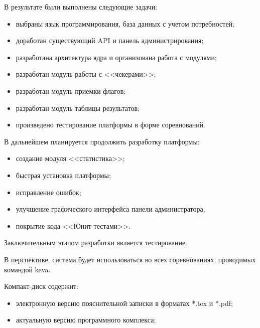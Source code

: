 В результате были выполнены следующие задачи: 

\begin{itemize}
\item выбраны язык программирования, база данных с учетом потребностей;
\item доработан существующий API и панель администрирования; 
\item разработана архитектура ядра и организована работа с модулями;
\item разработан модуль работы с <<чекерами>>;
\item разработан модуль приемки флагов;
\item разработан модуль таблицы результатов;
\item произведено тестирование платформы в форме соревнований.
\end{itemize}

В дальнейшем планируется продолжить разработку платформы:
\begin{itemize}
\item создание модуля <<статистика>>; 
\item быстрая установка платформы;
\item исправление ошибок;
\item улучшение графического интерфейса панели администратора;
\item покрытие кода <<Юнит-тестами>>.
\end{itemize}

Заключительным этапом разработки является тестирование.  

В перспективе, система будет использоваться во всех соревнованиях, проводимых командой keva.
 
 
 \newpage
 

 Компакт-диск содержит: 
 \begin{itemize}
 \item электронную версию пояснительной записки в форматах *.tex и *.pdf;
 \item актуальную версию программного комплекса;
 \end{itemize}
 

